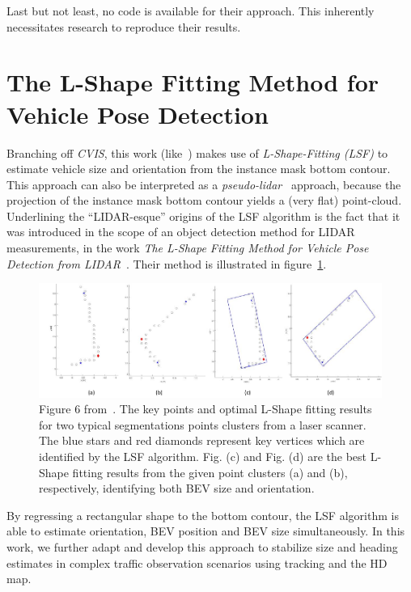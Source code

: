 Last but not least, no code is available for their approach.
This inherently necessitates research to reproduce their results.

\section{The L-Shape Fitting Method for Vehicle Pose Detection}
\label{sec:related-lshape-fitting}

Branching off \textit{CVIS}, this work (like~\cite{leonthesis}) makes use of \textit{L-Shape-Fitting (LSF)} to estimate vehicle size and orientation from the instance mask bottom contour.
This approach can also be interpreted as a \textit{pseudo-lidar}~\cite{survey2022} approach, because the projection of the instance mask bottom contour yields a (very flat) point-cloud.
Underlining the \enquote{LIDAR-esque} origins of the LSF algorithm is the fact that it was introduced in the scope of an object detection method for LIDAR measurements, in the work \textit{The L-Shape Fitting Method for Vehicle Pose Detection from LIDAR}~\cite{zhang2017efficient}.
Their method is illustrated in figure~\ref{fig:related-lsf}.

\begin{figure}[htb]
    \centering
    \includegraphics[width=1.0\linewidth]{figures/l_shape_fitting_fig}
    \caption{Figure 6 from~\cite{zhang2017efficient}. The key points and optimal L-Shape fitting results for two typical segmentations points clusters from a laser scanner. The blue stars and red diamonds represent key vertices which are identified by the LSF algorithm. Fig. (c) and Fig. (d) are the best L-Shape fitting results from the given point clusters (a) and (b), respectively, identifying both BEV size and orientation.}
    \label{fig:related-lsf}
\end{figure}

By regressing a rectangular shape to the bottom contour, the LSF algorithm is able to estimate orientation, BEV position and BEV size simultaneously.
In this work, we further adapt and develop this approach to stabilize size and heading estimates in complex traffic observation scenarios using tracking and the HD map.

